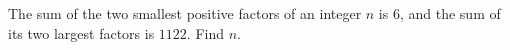 The sum of the two smallest positive factors of an integer $n$ is $6$, and the sum of its two largest factors is $1122$. Find $n$.
